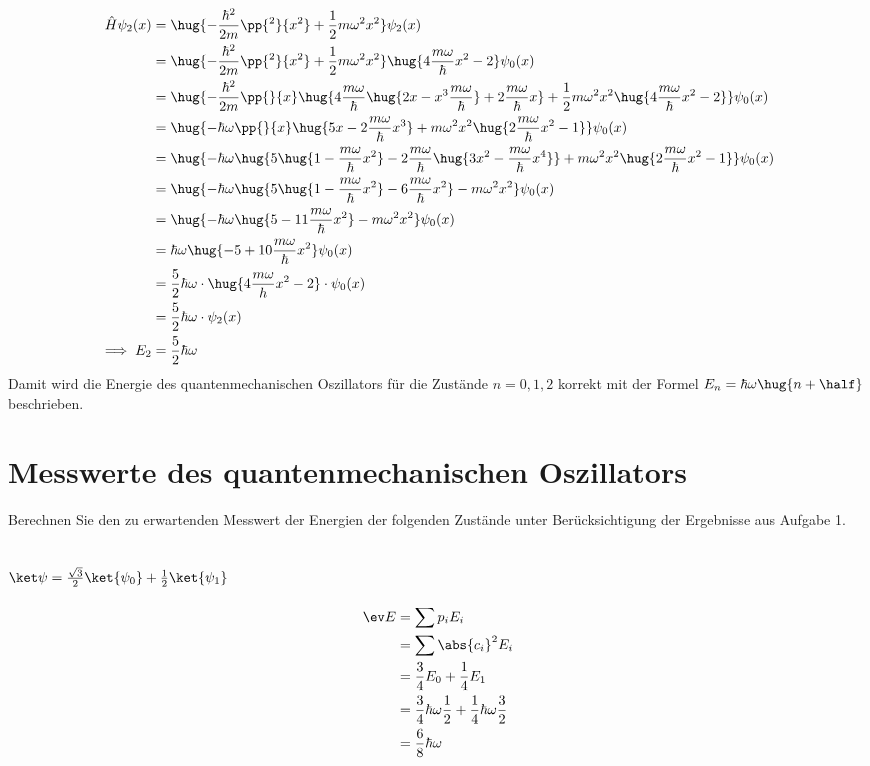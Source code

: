 \documentclass[ex]{exercise}
\begin{document}
\begin{align*}
    \hat H \psi_2(x) &= \hug{-\frac{\hbar^2}{2m} \pp{^2}{x^2}+ \frac12 m\omega^2 x^2}\psi_2(x)\\
    &= \hug{-\frac{\hbar^2}{2m} \pp{^2}{x^2}+ \frac12 m\omega^2 x^2}\hug{4\frac{m\omega}{\hbar}x^2 -2}\psi_0(x)\\
    &= \hug{-\frac{\hbar^2}{2m} \pp{}{x}\hug{4\frac{m\omega}{\hbar}\hug{2x - x^3\frac{m\omega}{\hbar}} + 2\frac{m\omega}{\hbar}x}+ \frac12 m\omega^2 x^2\hug{4\frac{m\omega}{\hbar}x^2 -2}}\psi_0(x)\\
    &= \hug{-\hbar \omega \pp{}{x}\hug{5x - 2\frac{m\omega}{\hbar} x^3}+ m\omega^2 x^2\hug{2\frac{m\omega}{\hbar}x^2 -1}}\psi_0(x)\\
    &= \hug{-\hbar \omega \hug{5\hug{1 - \frac{m\omega}{\hbar}x^2} - 2\frac{m\omega}{\hbar} \hug{3x^2 - \frac{m\omega}{\hbar}x^4}}+ m\omega^2 x^2\hug{2\frac{m\omega}{\hbar}x^2 -1}}\psi_0(x)\\
    &= \hug{-\hbar \omega \hug{5\hug{1 - \frac{m\omega}{\hbar}x^2} - 6\frac{m\omega}{\hbar} x^2}- m\omega^2 x^2} \psi_0(x)\\
    &= \hug{-\hbar \omega \hug{5-11\frac{m\omega}{\hbar}x^2}- m\omega^2 x^2} \psi_0(x)\\
    &= \hbar \omega\hug{-5 + 10\frac{m\omega}{\hbar}x^2} \psi_0(x)\\
    &= \frac52 \hbar \omega \cdot \hug{4\frac{m\omega}{h}x^2 - 2}\cdot\psi_0(x)\\
    &= \frac52 \hbar \omega \cdot \psi_2(x)\\
    \implies E_2 &= \frac52 \hbar \omega
\end{align*}
Damit wird die Energie des quantenmechanischen Oszillators für die Zustände \(n=0,1,2\)
korrekt mit der Formel \(E_n = \hbar \omega \hug{n + \half}\) beschrieben.


\section{Messwerte des quantenmechanischen Oszillators}
Berechnen Sie den zu erwartenden Messwert der Energien der folgenden Zustände unter Berücksichtigung
der Ergebnisse aus Aufgabe 1.
\subsection{\(\ket\psi = \frac{\sqrt3}{2}\ket{\psi_0} + \frac12 \ket{\psi_1}\)}
\begin{align*}
    \ev E &= \sum p_i E_i\\
    &= \sum \abs{c_i}^2 E_i\\
    &=  \frac34 E_0 + \frac14 E_1\\
    &=  \frac34\hbar\omega\frac12 + \frac14 \hbar \omega \frac32\\
    &=  \frac68 \hbar \omega
\end{align*}
\end{document}
